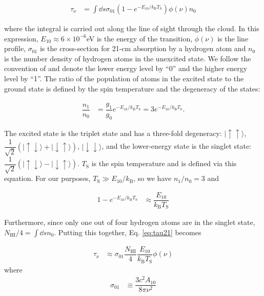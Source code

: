 \begin{align}
\tau_{\nu} &= \int \dd s \sigma_{01}\left( 1 - e^{-E_{10}/k_{\text{B}}T_{\text{S}}} \right) \phi(\nu) n_{0} \label{eq:tau21}
\end{align}

where the integral is carried out along the line of sight through the cloud. In this expression, $E_{10} \approx 6\times 10^{-6}$eV is the energy of the transition, $\phi(\nu)$ is the line profile, $\sigma_{01}$ is the cross-section for 21-cm absorption by a hydrogen atom and $n_{0}$ is the number density of hydrogen atoms in the unexcited state. We follow the convention of \cite{Furlanetto2006} and denote the lower energy level by ``0'' and the higher energy level by ``1''. The ratio of the population of atoms in the excited state to the ground state is defined by the spin temperature and the degeneracy of the states:

\begin{align}
\dfrac{n_{1}}{n_{0}} &= \dfrac{g_1}{g_0}e^{-E_{10}/k_{\text{B}}T_{\text{S}}} = 3 e^{-E_{10}/k_{\text{B}}T_{\text{S}}}.
\end{align}

The excited state is the triplet state and has a three-fold degeneracy: $|\uparrow \uparrow \rangle$, $\dfrac{1}{\sqrt{2}}(|\uparrow \downarrow\rangle + |\downarrow \uparrow \rangle)$, $|\downarrow \downarrow\rangle$, and the lower-energy state is the singlet state: $\dfrac{1}{\sqrt{2}}( |\uparrow \downarrow\rangle - |\downarrow \uparrow \rangle)$. $T_{\text{S}}$ is the spin temperature and is defined via this equation. For our purposes, $T_{\text{S}} \gg E_{10}/k_{\text{B}}$, so we have $n_{1}/n_{0} = 3$ and

\begin{align}
1 - e^{-E_{10}/k_{\text{B}}T_{\text{S}}} &\approx \dfrac{E_{10}}{k_{\text{B}}T_{\text{S}}}
\end{align}


 Furthermore, since only one out of four hydrogen atoms are in the singlet state, $N_{\text{HI}}/4 = \int \dd s n_{0}$. Putting this together, Eq. \ref{eq:tau21} becomes
 
\begin{align}
\tau_{\nu} &\approx \sigma_{01} \dfrac{N_{\text{HI}}}{4} \dfrac{E_{\text{10}}}{k_{\text{B}}T_{\text{S}}} \phi(\nu)
\end{align}
where 
\begin{align}
\sigma_{01} &\equiv \dfrac{3c^2 A_{10}}{8\pi\nu^{2}}
\end{align}

